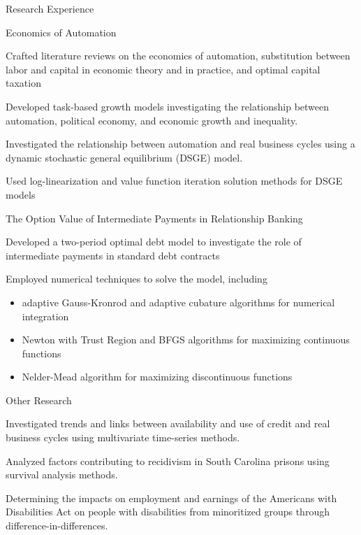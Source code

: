\documentclass{resume} %
\begin{document}
\begin{rSection}{Research Experience}
    \begin{rSubsection}{Economics of Automation}{}{}{}
        \item Crafted literature reviews on the economics of automation, substitution between labor and capital in economic theory and in practice, and optimal capital taxation
        \item Developed task-based growth models investigating the relationship between automation, political economy, and economic growth and inequality.
        \item Investigated the relationship between automation and real business cycles using a dynamic stochastic general equilibrium (DSGE) model.
        \item Used log-linearization and value function iteration solution methods for DSGE models
    \end{rSubsection}

    \begin{rSubsection}{The Option Value of Intermediate Payments in Relationship Banking}{}{}{}
        \item Developed a two-period optimal debt model to investigate the role of intermediate payments in standard debt contracts
        \item Employed numerical techniques to solve the model, including 
        \begin{itemize}
            \item adaptive Gauss-Kronrod and adaptive cubature algorithms for numerical integration
            \item Newton with Trust Region and BFGS algorithms for maximizing continuous functions
            \item Nelder-Mead algorithm for maximizing discontinuous functions
        \end{itemize}
    \end{rSubsection}

    \begin{rSubsection}{Other Research}{}{}{}
        \item Investigated trends and links between availability and use of credit and real business cycles using multivariate time-series methods.
        \item Analyzed factors contributing to recidivism in South Carolina prisons using survival analysis methods.
        \item Determining the impacts on employment and earnings of the Americans with Disabilities Act on people with disabilities from minoritized groups through difference-in-differences.
    \end{rSubsection}
\end{rSection}
\end{document}
